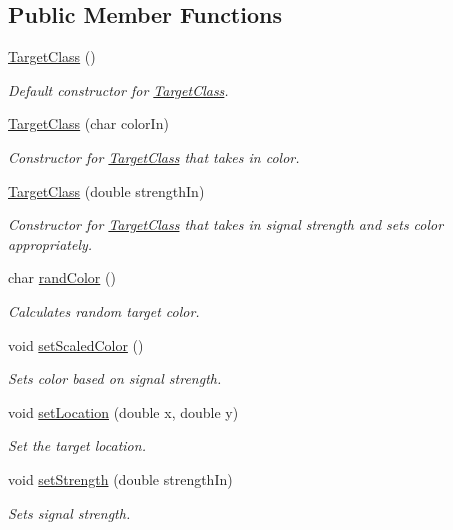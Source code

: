 \subsection*{Public Member Functions}
\begin{DoxyCompactItemize}
\item 
\hyperlink{classTargetClass_aa851f8197d417b015e21f060442bfc88}{Target\-Class} ()
\begin{DoxyCompactList}\small\item\em Default constructor for \hyperlink{classTargetClass}{Target\-Class}. \end{DoxyCompactList}\item 
\hyperlink{classTargetClass_a94f1a6460368b44849aedcc7a4e46fc4}{Target\-Class} (char color\-In)
\begin{DoxyCompactList}\small\item\em Constructor for \hyperlink{classTargetClass}{Target\-Class} that takes in color. \end{DoxyCompactList}\item 
\hyperlink{classTargetClass_a9bd1422bf34f02a1de952d34e02f0096}{Target\-Class} (double strength\-In)
\begin{DoxyCompactList}\small\item\em Constructor for \hyperlink{classTargetClass}{Target\-Class} that takes in signal strength and sets color appropriately. \end{DoxyCompactList}\item 
char \hyperlink{classTargetClass_ada9bba81c11cf8ebd5b4cad9e0542354}{rand\-Color} ()
\begin{DoxyCompactList}\small\item\em Calculates random target color. \end{DoxyCompactList}\item 
void \hyperlink{classTargetClass_a4c812fc241a8b0f4cc21ed56e0ed669c}{set\-Scaled\-Color} ()
\begin{DoxyCompactList}\small\item\em Sets color based on signal strength. \end{DoxyCompactList}\item 
void \hyperlink{classTargetClass_ac6d882304b638f48e5cab2a1b5b82551}{set\-Location} (double x, double y)
\begin{DoxyCompactList}\small\item\em Set the target location. \end{DoxyCompactList}\item 
void \hyperlink{classTargetClass_a5dc5709d00a7f5775c64b28d119e318e}{set\-Strength} (double strength\-In)
\begin{DoxyCompactList}\small\item\em Sets signal strength. \end{DoxyCompactList}\end{DoxyCompactItemize}
